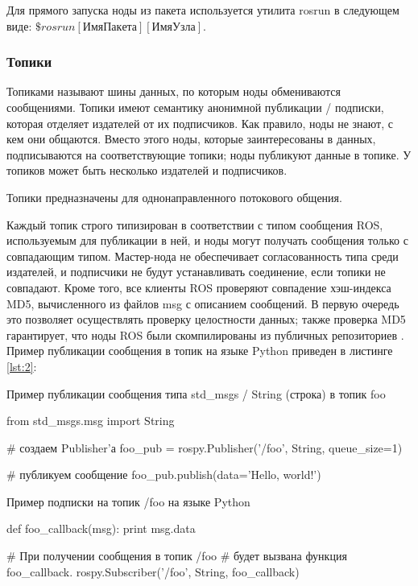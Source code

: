 Для прямого запуска ноды из пакета используется утилита rosrun в следующем виде: \(\$ rosrun [ИмяПакета] [ИмяУзла]\).

\subsubsection{Топики}
Топиками называют шины данных, по которым ноды обмениваются сообщениями. Топики имеют семантику анонимной публикации / подписки, которая отделяет издателей от их подписчиков. Как правило, ноды не знают, с кем они общаются. Вместо этого ноды, которые заинтересованы в данных, подписываются на соответствующие топики; ноды публикуют данные в топике. У топиков может быть несколько издателей и подписчиков.

Топики предназначены для однонаправленного потокового общения.

Каждый топик строго типизирован в соответствии с типом сообщения ROS, используемым для публикации в ней, и ноды могут получать сообщения только с совпадающим типом. Мастер-нода не обеспечивает согласованность типа среди издателей, и подписчики не будут устанавливать соединение, если топики не совпадают. Кроме того, все клиенты ROS проверяют совпадение хэш-индекса MD5, вычисленного из файлов msg с описанием сообщений. В первую очередь это позволяет осуществлять проверку целостности данных; также проверка MD5 гарантирует, что ноды ROS были скомпилированы из публичных репозиториев \cite{ros}. Пример публикации сообщения в топик на языке Python приведен в листинге \ref{lst:2}:
\begin{Program}[H]
	\caption{Пример публикации сообщения типа std\_msgs / String (строка) в топик foo} \label{lst:2}
\begin{MyCode}
from std_msgs.msg import String

# создаем Publisher'а
foo_pub = rospy.Publisher('/foo', String, queue_size=1)

# публикуем сообщение
foo_pub.publish(data='Hello, world!')
\end{MyCode}
\end{Program}

\begin{Program}[H]
	\caption{Пример подписки на топик /foo на языке Python} \label{lst:3}
\begin{MyCode}
def foo_callback(msg):
	print msg.data

# При получении сообщения в топик /foo
# будет вызвана функция foo_callback.
rospy.Subscriber('/foo', String, foo_callback)
\end{MyCode}
\end{Program}

